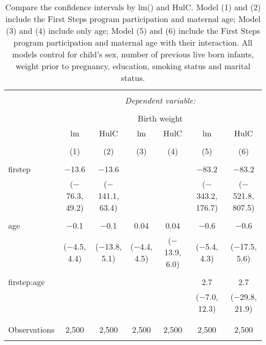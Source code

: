 
\begin{table}[!htbp] \centering 
  \caption{Compare the confidence intervals by lm() and HulC. Model (1) and (2) include the First Steps program participation and maternal age; Model (3) and (4) include only age; Model (5) and (6) include the First Steps program participation and maternal age with their interaction. All models control for child’s sex, number of previous live born infants, weight prior to pregnancy, education, smoking status and marital status.} 
  \label{tbl:lm-ci} 
\begin{tabular}{@{\extracolsep{-10pt}}lcccccc} 
\\[-1.8ex]\hline 
\hline \\[-1.8ex] 
 & \multicolumn{6}{c}{\textit{Dependent variable:}} \\ 
\cline{2-7} 
\\[-1.8ex] & \multicolumn{6}{c}{Birth weight} \\ 
 & lm & HulC & lm & HulC & lm & HulC \\ 
\\[-1.8ex] & (1) & (2) & (3) & (4) & (5) & (6)\\ 
\hline \\[-1.8ex] 
 firstep & $-$13.6 & $-$13.6 &  &  & $-$83.2 & $-$83.2 \\ 
  & ($-$76.3, 49.2) & ($-$141.1, 63.4) &  &  & ($-$343.2, 176.7) & ($-$521.8, 807.5) \\ 
  & & & & & & \\ 
 age & $-$0.1 & $-$0.1 & 0.04 & 0.04 & $-$0.6 & $-$0.6 \\ 
  & ($-$4.5, 4.4) & ($-$13.8, 5.1) & ($-$4.4, 4.5) & ($-$13.9, 6.0) & ($-$5.4, 4.3) & ($-$17.5, 5.6) \\ 
  & & & & & & \\ 
 firstep:age &  &  &  &  & 2.7 & 2.7 \\ 
  &  &  &  &  & ($-$7.0, 12.3) & ($-$29.8, 21.9) \\ 
  & & & & & & \\ 
\hline \\[-1.8ex] 
Observations & 2,500 & 2,500 & 2,500 & 2,500 & 2,500 & 2,500 \\ 
\hline 
\hline \\[-1.8ex] 
\end{tabular} 
\end{table} 
